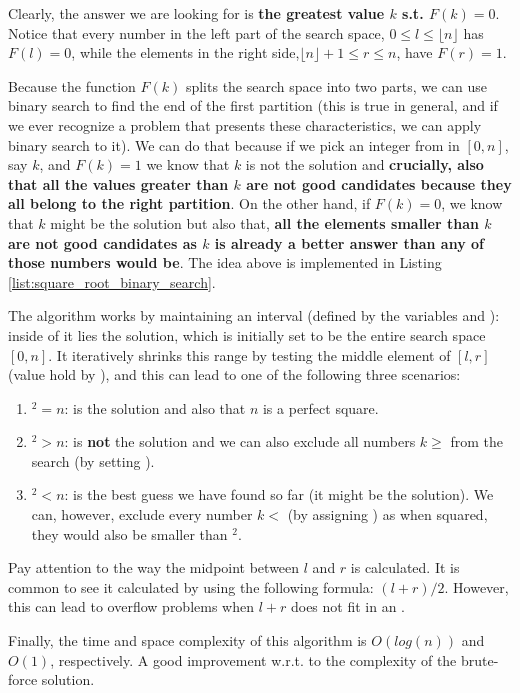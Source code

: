 Clearly, the answer we are looking for is \textbf{the greatest value $k$ s.t. $F(k) = 0$}. 
Notice that every number in the left part of the search space, $0 \leq l \leq \lfloor n \rfloor$ has $F(l) = 0$, while the elements in the right side,$\lfloor n \rfloor +1 \leq r \leq n$, have $F(r) = 1$.

Because the function $F(k)$ splits the search space into two parts, we can use
binary search to find the end of the first partition (this is true in general, and if we ever recognize a problem that presents these characteristics, we can apply binary search to it). 
We can do that because if we pick an integer from in $[0,n]$, say $k$, and $F(k) = 1$ we know that $k$ is not the solution and \textbf{crucially, also that
all the values greater than $k$ are not good candidates because they all belong to the right partition}.
On the other hand, if $F(k) = 0$, we know that $k$ might be the solution but also that, \textbf{all the elements smaller than $k$ are not good candidates as $k$ is already a better answer than any of those numbers would be}.
The idea above is implemented in Listing \ref{list:square_root_binary_search}. 



The algorithm works by maintaining an interval (defined by the variables  and ): inside of it lies the solution,  which is initially set to be the entire search space $[0,n]$.
It iteratively shrinks this range by testing the middle element of $[l,r]$ (value hold by ), and this can lead to one of the following three scenarios:

 \begin{enumerate}
	 \item {}$^2  = n$:  is the solution and also that $n$ is a perfect square.
	 \item {}$^2 > n$:  is \textbf{not} the solution and we can also exclude
	 all numbers $k \geq $  from the search (by setting ).
	 \item {}$^2  < n$:  is the best guess we have found so far (it might be the solution). We can, however, exclude every number $k <$ (by assigning ) as when squared, they would also be smaller than $^2$.
 \end{enumerate}

 Pay attention to the way the midpoint between $l$ and $r$ is calculated. 
 It is common to see it calculated by using the following formula: $(l+r)/2$.
 However, this can lead to overflow problems when $l+r$ does not fit in an .

Finally, the time and space complexity of this algorithm is $O(log(n))$ and $O(1)$, respectively. A good improvement w.r.t. to the complexity of the brute-force solution.

